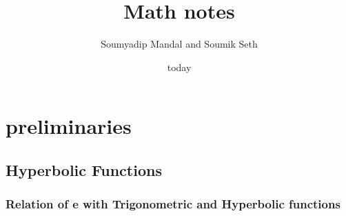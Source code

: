\documentclass{book}
\title{Math notes}
\author{Soumyadip Mandal and Soumik Seth}
\date{today}
\begin{document}
\maketitle

\tableofcontents

\chapter{preliminaries}

\section{Hyperbolic Functions}

\subsection{Relation of e with Trigonometric and Hyperbolic functions}
\end{document}
